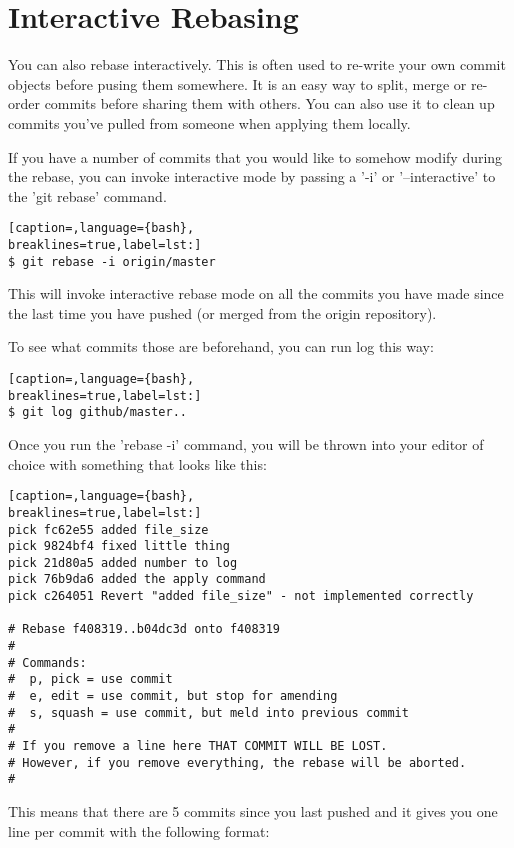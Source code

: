 \section{Interactive Rebasing}
You can also rebase interactively. This is often used to re-write your own
commit objects before pusing them somewhere. It is an easy way to split, merge
or re-order commits before sharing them with others. You can also use it to
clean up commits you've pulled from someone when applying them locally.

If you have a number of commits that you would like to somehow modify during
the rebase, you can invoke interactive mode by passing a '-i' or
'--interactive' to the 'git rebase' command.
\lstset{basicstyle=\scriptsize, numbers=none, captionpos=b, tabsize=4}
\begin{lstlisting}[caption=,language={bash},
breaklines=true,label=lst:]
$ git rebase -i origin/master
\end{lstlisting}

This will invoke interactive rebase mode on all the commits you have made since
the last time you have pushed (or merged from the origin repository).

To see what commits those are beforehand, you can run log this way:

\lstset{basicstyle=\scriptsize, numbers=none, captionpos=b, tabsize=4}
\begin{lstlisting}[caption=,language={bash},
breaklines=true,label=lst:]
$ git log github/master..
\end{lstlisting}
Once you run the 'rebase -i' command, you will be thrown into your editor of
choice with something that looks like this:
\lstset{basicstyle=\scriptsize, numbers=none, captionpos=b, tabsize=4}
\begin{lstlisting}[caption=,language={bash},
breaklines=true,label=lst:]
pick fc62e55 added file_size
pick 9824bf4 fixed little thing
pick 21d80a5 added number to log
pick 76b9da6 added the apply command
pick c264051 Revert "added file_size" - not implemented correctly

# Rebase f408319..b04dc3d onto f408319
#
# Commands:
#  p, pick = use commit
#  e, edit = use commit, but stop for amending
#  s, squash = use commit, but meld into previous commit
#
# If you remove a line here THAT COMMIT WILL BE LOST.
# However, if you remove everything, the rebase will be aborted.
#
\end{lstlisting}

This means that there are 5 commits since you last pushed and it gives you one
line per commit with the following format:

